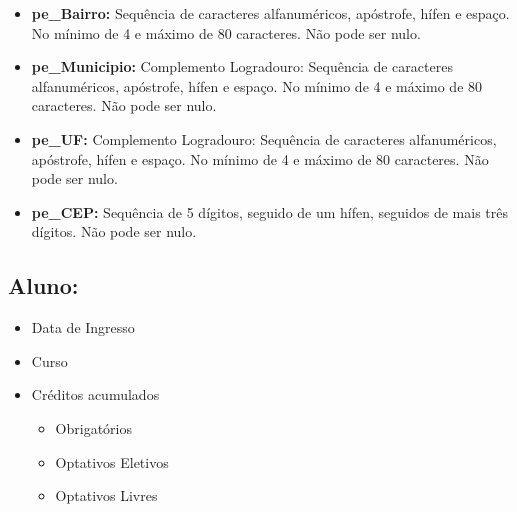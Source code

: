 \documentclass{report}
\begin{document}
\begin{itemize}
\begin{itemize}
  	\item \textbf{pe\_Bairro:} Sequência de caracteres alfanuméricos, apóstrofe, hífen e espaço. No mínimo de 4 e máximo de 80 caracteres. Não pode ser nulo.
  	\item \textbf{pe\_Municipio:} Complemento Logradouro: Sequência de caracteres alfanuméricos, apóstrofe, hífen e espaço. No mínimo de 4 e máximo de 80 caracteres. Não pode ser nulo.
  	\item \textbf{pe\_UF:} Complemento Logradouro: Sequência de caracteres alfanuméricos, apóstrofe, hífen e espaço. No mínimo de 4 e máximo de 80 caracteres. Não pode ser nulo.
  	\item \textbf{pe\_CEP:} Sequência de 5 dígitos, seguido de um hífen, seguidos de mais três dígitos. Não pode ser nulo.
  	\end{itemize}
\end{itemize}

\subsection{Aluno:}
\begin{itemize}
  \item Data de Ingresso
  \item Curso
  \item Créditos acumulados
  \begin{itemize}
  	\item Obrigatórios
  	\item Optativos Eletivos
  	\item Optativos Livres
  \end{itemize}

\end{itemize}
\end{document}
